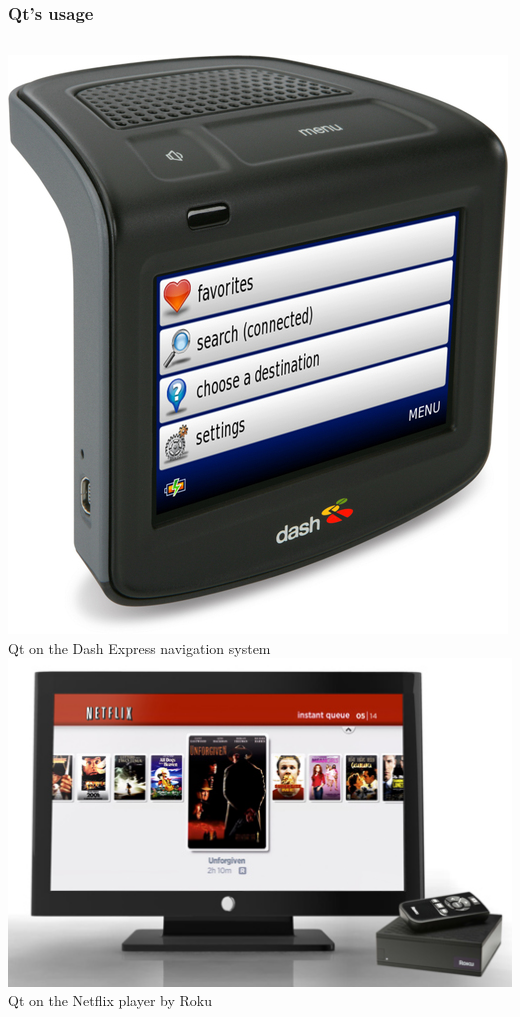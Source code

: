 \begin{frame}
  \frametitle{Qt's usage}
  \begin{columns}
    \includegraphics[width=\textwidth]{slides/sysdev-embedded-linux/dash-express-gui.jpg}\\
    Qt on the Dash Express navigation system
    \includegraphics[width=\textwidth]{slides/sysdev-embedded-linux/roku-netflix-gui.jpg}\\
    Qt on the Netflix player by Roku
  \end{columns}
\end{frame}

